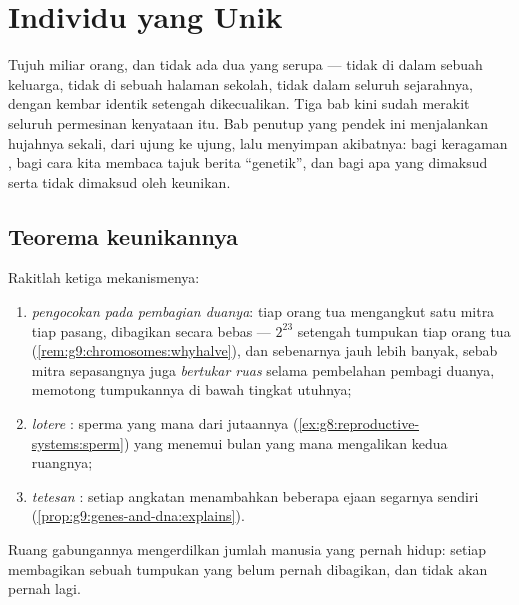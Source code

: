 \chapter{Individu yang Unik}\label{ch:g9:unique-individuals}

Tujuh miliar orang, dan tidak ada dua yang serupa --- tidak
di dalam sebuah keluarga, tidak di sebuah halaman sekolah,
tidak dalam seluruh sejarahnya, dengan kembar identik
setengah dikecualikan. Tiga bab kini sudah merakit seluruh
permesinan kenyataan itu. Bab penutup yang pendek ini
menjalankan hujahnya sekali, dari ujung ke ujung, lalu
menyimpan akibatnya: bagi keragaman , bagi cara
kita membaca tajuk berita ``genetik'', dan bagi apa yang
dimaksud serta tidak dimaksud oleh keunikan.

\section{Teorema keunikannya}

\begin{proposition}\label{prop:g9:unique-individuals:theorem}
Rakitlah ketiga mekanismenya:
\begin{enumerate}
  \item \emph{pengocokan pada pembagian duanya}:  tiap
        orang tua mengangkut satu mitra tiap pasang,
        dibagikan secara bebas --- $2^{23}$ setengah
        tumpukan tiap orang tua
        (\cref{rem:g9:chromosomes:whyhalve}), dan sebenarnya
        jauh lebih banyak, sebab mitra sepasangnya juga
        \emph{bertukar ruas} selama pembelahan pembagi
        duanya, memotong tumpukannya di bawah tingkat
         utuhnya;
  \item \emph{lotere }: sperma yang mana dari
        jutaannya (\cref{ex:g8:reproductive-systems:sperm})
        yang menemui  bulan yang mana mengalikan kedua
        ruangnya;
  \item \emph{tetesan }: setiap angkatan
        menambahkan beberapa ejaan segarnya sendiri
        (\cref{prop:g9:genes-and-dna:explains}).
\end{enumerate}
Ruang gabungannya mengerdilkan jumlah manusia yang pernah
hidup: setiap  membagikan sebuah tumpukan yang
belum pernah dibagikan, dan tidak akan pernah lagi.
\end{proposition}
\admitted

